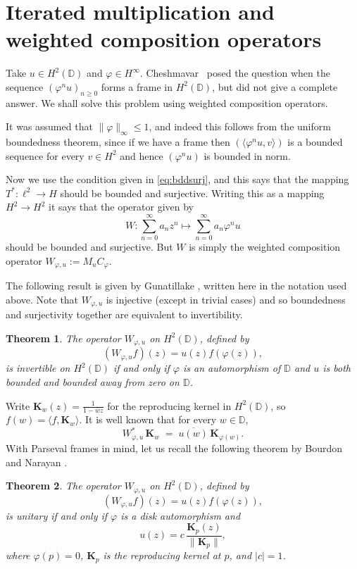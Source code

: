 \documentclass[11pt]{amsart}
\newtheorem{thm}{Theorem}[section]
\theoremstyle{definition}
\theoremstyle{remark}
\numberwithin{equation}{section}
\def\DD{{\mathbb D}}
\def\phi{\varphi}
\begin{document}
\section{Iterated multiplication and weighted composition operators}\label{sec:4}


Take $u \in H^2(\DD)$ and $\phi \in H^\infty$.
Cheshmavar~\cite{chesh} posed the question when the sequence $(\phi^n u)_{n\geq 0}$
forms a frame in $H^2(\DD)$, but did not give a complete answer. We shall solve this problem using weighted composition operators.

It was assumed that $\|\phi\|_\infty \le 1$, and indeed this follows from the uniform boundedness theorem,
since if we have a frame then $(\langle \phi^n u, v \rangle)$ is a bounded sequence for every
$v \in H^2$ and hence $(\phi^n u)$ is bounded in norm.

Now we use the condition given in \eqref{eq:bddsurj}, and this says that the
mapping $T^*: \ell^2 \to H$ should be bounded and surjective. Writing this
as a  mapping     $H^2 \to H^2$ it says that the operator given by
\[
W: \sum_{n=0}^\infty a_n z^n \mapsto \sum_{n=0}^\infty a_n \phi^n u
\]
should be bounded and surjective. But $W$ is simply the weighted composition operator $W_{\phi,u}:=M_u C_\phi$.

The following result is given by Gunatillake \cite[Thm.~2.0.1]{gun}, written here in the
notation used above. Note that $W_{\phi,u}$ is injective (except in   trivial cases)
and so boundedness and surjectivity together are equivalent to invertibility.

\begin{thm}
The operator $W_{\varphi, u}$ on $H^2(\DD)$, defined by
\[
   (W_{\varphi, u} f)(z) =  u(z) f(\varphi(z)),
\]
 is invertible on $H^2(\DD)$ if and only if $\phi$ is an automorphism of $\DD$
and $u$ is both bounded and bounded away from zero on $\DD$.
\end{thm}





Write $\mathbf{K}_w(z)=\frac{1}{1-\overline{w}z}$ for the reproducing kernel in $H^2(\DD)$, so
$f(w)=\langle f,\mathbf{K}_w\rangle$.
It is well known that for
 every $w\in\mathbb D$,
\[
W_{\varphi, u}^*\,\mathbf{K}_w \;=\; \overline{ u(w)}\,\mathbf{K}_{\varphi(w)}.
\]
With Parseval frames in mind, let us recall the following theorem by Bourdon and Narayan \cite{BourdonNarayan2010}.

\begin{thm}\label{thm:BN}
The operator $W_{\varphi, u}$ on $H^2(\DD)$, defined by
\[
   (W_{\varphi, u} f)(z) =  u(z) f(\varphi(z)),
\]
is unitary if and only if $\varphi$ is a disk automorphism and
\[
    u(z) = c \, \frac{\mathbf{K}_p(z)}{\|\mathbf{K}_p\|},
\]
where $\varphi(p) = 0$, $\mathbf{K}_p$ is the reproducing kernel at $p$, and $|c| = 1$.
\end{thm}
\end{document}

